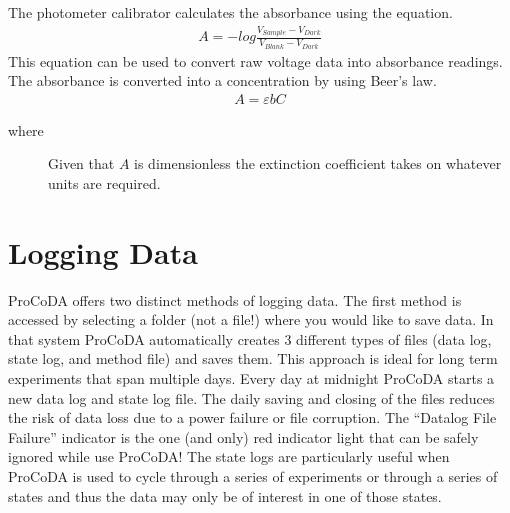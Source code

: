 \documentclass[letterpaper,10pt,english]{sphinxmanual}
\begin{document}
The photometer calibrator calculates the absorbance using the equation.
\begin{equation}\label{equation:ProCoDA/ProCoDA:ProCoDA/ProCoDA:1}
\begin{split}A = -log \frac{V_{Sample} - V_{Dark}}{V_{Blank} - V_{Dark}}\end{split}
\end{equation}
This equation can be used to convert raw voltage data into absorbance readings. The absorbance is converted into a concentration by using Beer’s law.
\begin{equation}\label{equation:ProCoDA/ProCoDA:ProCoDA/ProCoDA:2}
\begin{split}A = \varepsilon bC\end{split}
\end{equation}\begin{description}
\item[{where}] \leavevmode
{}

Given that \(A\) is dimensionless the extinction coefficient takes on whatever units are required.

\end{description}


\section{Logging Data}
\label{\detokenize{ProCoDA/ProCoDA:logging-data}}\label{\detokenize{ProCoDA/ProCoDA:heading-procoda-logging-data}}
ProCoDA offers two distinct methods of logging data. The first method is accessed by selecting a folder (not a file!) where you would like to save data.  In that system ProCoDA automatically creates 3 different types of files (data log, state log, and method file) and saves them. This approach is ideal for long term experiments that span multiple days. Every day at midnight ProCoDA starts a new data log and state log file. The daily saving and closing of the files reduces the risk of data loss due to a power failure or file corruption. The “Datalog File Failure” indicator is the one (and only) red indicator light that can be safely ignored while use ProCoDA! The state logs are particularly useful when ProCoDA is used to cycle through a series of experiments or through a series of states and thus the data may only be of interest in one of those states.
\end{document}

